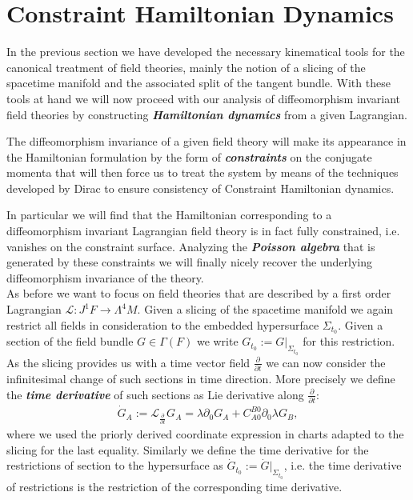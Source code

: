 \documentclass[a4paper,12pt, DIV=14, BCOR=5mm, twoside, headsepline]{scrbook}
\begin{document}
\section{Constraint Hamiltonian Dynamics}
In the previous section we have developed the necessary kinematical tools for the canonical treatment of field theories, mainly the notion  of a slicing of the spacetime manifold and the associated split of the tangent bundle. With these tools at hand we will now proceed with our analysis of diffeomorphism invariant field theories by constructing \textbf{\textit{Hamiltonian dynamics}} from a given Lagrangian.

The diffeomorphism invariance of a given field theory will make its appearance in the Hamiltonian formulation by the form of \textit{\textbf{constraints}} on the conjugate momenta that will then force us to treat the system by means of the techniques developed by Dirac to ensure consistency of Constraint Hamiltonian dynamics.

In particular we will find that the Hamiltonian corresponding to a diffeomorphism invariant Lagrangian field theory is in fact fully constrained, i.e. vanishes on the constraint surface. Analyzing the \textit{\textbf{Poisson algebra}} that is generated by these constraints we will finally nicely recover the underlying diffeomorphism invariance of the theory.\\

As before we want to focus on field theories that are described by a first order Lagrangian $\mathcal{L} : J^1F \rightarrow \Lambda^4M$. Given a slicing of the spacetime manifold we again restrict all fields in consideration to the embedded hypersurface $\Sigma_{t_0}$. Given a section of the field bundle $G \in \Gamma(F)$ we write $G_{t_0} := G \vert _{\Sigma_{t_0}}$ for this restriction. As the slicing provides us with a time vector field $\frac{\partial}{\partial t}$ we can now consider the infinitesimal change of such sections in time direction. More precisely we define the \textbf{\textit{time derivative}} of such sections as Lie derivative along $\frac{\partial}{\partial t}$: 
\begin{align}
    \dot{G}_A := \mathcal{L}_{\frac{\partial}{\partial t}}G_A = \lambda \partial_0 G_A + C^{B0}_{A0} \partial_0 \lambda G_B,
\end{align}
where we used the priorly derived coordinate expression in charts adapted to the slicing for the last equality. Similarly we define the time derivative for the restrictions of section to the hypersurface as $\dot{G}_{t_0}:= \dot{G} \vert_{\Sigma_{t_0}}$, i.e. the time derivative of restrictions is the restriction of the corresponding time derivative.
\end{document}

